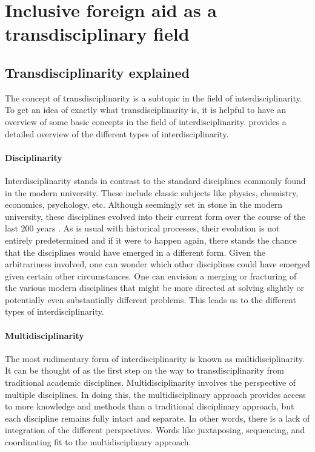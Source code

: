 \documentclass[a4paper]{article}
\begin{document}
\newpage
\section{Inclusive foreign aid as a transdisciplinary field}

\subsection{Transdisciplinarity explained}

The concept of transdisciplinarity is a subtopic in the field of
interdisciplinarity. To get an idea of exactly what transdisciplinarity is, it
is helpful to have an overview of some basic concepts in the field of
interdisciplinarity. \cite{klein2010taxonomy} provides a detailed overview of
the different types of interdisciplinarity.

\paragraph{Disciplinarity}

Interdisciplinarity stands in contrast to the standard disciplines commonly
found in the modern university. These include classic subjects like physics,
chemistry, economics, psychology, etc. Although seemingly set in stone in the
modern university, these disciplines evolved into their current form over the
course of the last 200 years \cite{weingart2010short}. As is usual with
historical processes, their evolution is not entirely predetermined and if it
were to happen again, there stands the chance that the disciplines would have
emerged in a different form. Given the arbitrariness involved, one can wonder
which other disciplines could have emerged given certain other circumstances.
One can envision a merging or fracturing of the various modern disciplines
that might be more directed at solving slightly or potentially even
substantially different problems. This leads us to the different types of
interdisciplinarity.

\paragraph{Multidisciplinarity}

The most rudimentary form of interdisciplinarity is known as
multidisciplinarity. It can be thought of as the first step on the way to
transdisciplinarity from traditional academic disciplines. Multidisciplinarity
involves the perspective of multiple disciplines. In doing this, the
multidisciplinary approach provides access to more knowledge and methods than
a traditional disciplinary approach, but each discipline remains fully intact
and separate. In other words, there is a lack of integration of the different
perspectives.  Words like juxtaposing, sequencing, and coordinating fit to the
multidisciplinary approach. 
\end{document}
